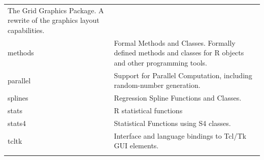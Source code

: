 \documentclass[]{book}
\theoremstyle{definition}
\theoremstyle{definition}
\theoremstyle{definition}
\theoremstyle{remark}
\begin{document}
\begin{longtable}[]{@{}ll@{}}
\begin{minipage}[t]{0.81\columnwidth}
The Grid Graphics Package. A rewrite of the graphics layout
capabilities.\strut
\end{minipage}\tabularnewline
\begin{minipage}[t]{0.13\columnwidth}\raggedright\strut
methods\strut
\end{minipage} & \begin{minipage}[t]{0.81\columnwidth}\raggedright\strut
Formal Methods and Classes. Formally defined methods and classes for R
objects and other programming tools.\strut
\end{minipage}\tabularnewline
\begin{minipage}[t]{0.13\columnwidth}\raggedright\strut
parallel\strut
\end{minipage} & \begin{minipage}[t]{0.81\columnwidth}\raggedright\strut
Support for Parallel Computation, including random-number
generation.\strut
\end{minipage}\tabularnewline
\begin{minipage}[t]{0.13\columnwidth}\raggedright\strut
splines\strut
\end{minipage} & \begin{minipage}[t]{0.81\columnwidth}\raggedright\strut
Regression Spline Functions and Classes.\strut
\end{minipage}\tabularnewline
\begin{minipage}[t]{0.13\columnwidth}\raggedright\strut
stats\strut
\end{minipage} & \begin{minipage}[t]{0.81\columnwidth}\raggedright\strut
R statistical functions\strut
\end{minipage}\tabularnewline
\begin{minipage}[t]{0.13\columnwidth}\raggedright\strut
stats4\strut
\end{minipage} & \begin{minipage}[t]{0.81\columnwidth}\raggedright\strut
Statistical Functions using S4 classes.\strut
\end{minipage}\tabularnewline
\begin{minipage}[t]{0.13\columnwidth}\raggedright\strut
tcltk\strut
\end{minipage} & \begin{minipage}[t]{0.81\columnwidth}\raggedright\strut
Interface and language bindings to Tcl/Tk GUI elements.\strut
\end{minipage}\tabularnewline
\begin{minipage}[t]{0.13\columnwidth}\raggedright\strut

\end{minipage}
\end{longtable}
\end{document}
